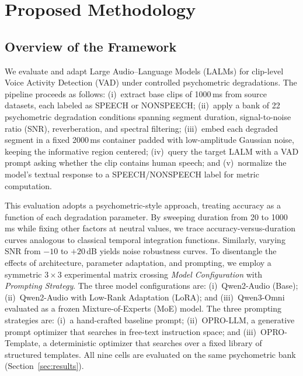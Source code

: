 \documentclass[11pt,a4paper]{article}
\begin{document}
\section{Proposed Methodology}
\label{sec:method}

\subsection{Overview of the Framework}
\label{subsec:overview}

We evaluate and adapt Large Audio--Language Models (LALMs) for clip-level Voice Activity Detection (VAD) under controlled psychometric degradations. The pipeline proceeds as follows: (i)~extract base clips of 1000\,ms from source datasets, each labeled as SPEECH or NONSPEECH; (ii)~apply a bank of 22 psychometric degradation conditions spanning segment duration, signal-to-noise ratio (SNR), reverberation, and spectral filtering; (iii)~embed each degraded segment in a fixed 2000\,ms container padded with low-amplitude Gaussian noise, keeping the informative region centered; (iv)~query the target LALM with a VAD prompt asking whether the clip contains human speech; and (v)~normalize the model's textual response to a SPEECH/NONSPEECH label for metric computation.

This evaluation adopts a psychometric-style approach, treating accuracy as a function of each degradation parameter. By sweeping duration from 20 to 1000\,ms while fixing other factors at neutral values, we trace accuracy-versus-duration curves analogous to classical temporal integration functions. Similarly, varying SNR from $-10$ to $+20$\,dB yields noise robustness curves. To disentangle the effects of architecture, parameter adaptation, and prompting, we employ a symmetric $3 \times 3$ experimental matrix crossing \textit{Model Configuration} with \textit{Prompting Strategy}. The three model configurations are: (i)~Qwen2-Audio (Base); (ii)~Qwen2-Audio with Low-Rank Adaptation (LoRA); and (iii)~Qwen3-Omni evaluated as a frozen Mixture-of-Experts (MoE) model. The three prompting strategies are: (i)~a hand-crafted baseline prompt; (ii)~OPRO-LLM, a generative prompt optimizer that searches in free-text instruction space; and (iii)~OPRO-Template, a deterministic optimizer that searches over a fixed library of structured templates. All nine cells are evaluated on the same psychometric bank (Section~\ref{sec:results}).
\end{document}
